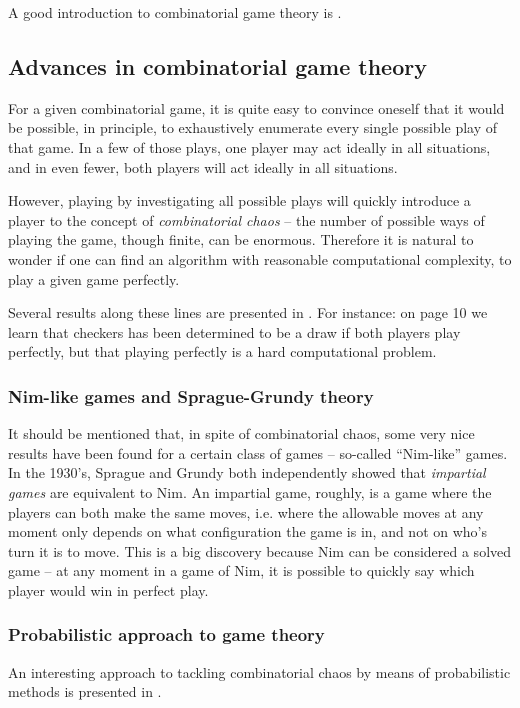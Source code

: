 A good introduction to combinatorial game theory is \citep{winning_ways}.

\subsection{Advances in combinatorial game theory}

For a given combinatorial game, it is quite easy to convince oneself that it would be possible, in principle, to exhaustively enumerate every single possible play of that game.
In a few of those plays, one player may act ideally in all situations, and in even fewer, both players will act ideally in all situations.

However, playing by investigating all possible plays will quickly introduce a player to the concept of \emph{combinatorial chaos} -- the number of possible ways of playing the game, though finite, can be enormous.
Therefore it is natural to wonder if one can find an algorithm with reasonable computational complexity, to play a given game perfectly.

Several results along these lines are presented in \citep{demaine_hearn08}. For instance: on page 10 we learn that checkers has been determined to be a draw if both players play perfectly, but that playing perfectly is a hard computational problem.

\subsubsection{Nim-like games and Sprague-Grundy theory}

It should be mentioned that, in spite of combinatorial chaos, some very nice results have been found for a certain class of games -- so-called ``Nim-like'' games.
In the 1930's, Sprague and Grundy both independently showed that \emph{impartial games} are equivalent to Nim.
An impartial game, roughly, is a game where the players can both make the same moves, i.e. where the allowable moves at any moment only depends on what configuration the game is in, and not on who's turn it is to move.
This is a big discovery because Nim can be considered a solved game -- at any moment in a game of Nim, it is possible to quickly say which player would win in perfect play.

\subsubsection{Probabilistic approach to game theory}

An interesting approach to tackling combinatorial chaos by means of probabilistic methods is presented in \citep{beck08}.
